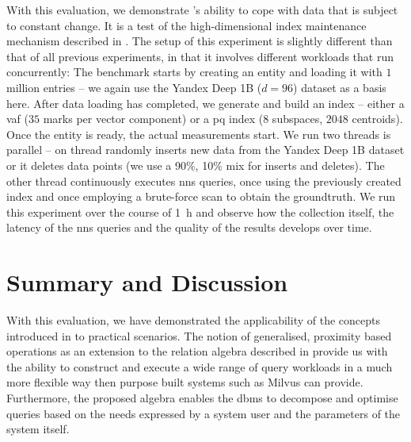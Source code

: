 With this evaluation, we demonstrate \cottontail{}'s ability to cope with data that is subject to constant change. It is a test of the high-dimensional index maintenance mechanism described in . The setup of this experiment is slightly different than that of all previous experiments, in that it involves different workloads that run concurrently: The benchmark starts by creating an entity and loading it with $1$ million entries -- we again use the Yandex Deep 1B ($d = 96$) dataset as a basis here. After data loading has completed, we generate and build an index -- either a \acrshort{vaf} ($35$ marks per vector component) or a \acrshort{pq} index ($8$ subspaces, $2048$ centroids). Once the entity is ready, the actual measurements start. We run two threads is parallel -- on thread randomly inserts new data from the Yandex Deep 1B dataset or it deletes data points (we use a 90\%, 10\% mix for inserts and deletes). The other thread continuously executes \acrshort{nns} queries, once using the previously created index and once employing a brute-force scan to obtain the groundtruth. We run this experiment over the course of \SI{1}{\hour} and observe how the collection itself, the latency of the \acrshort{nns} queries and the quality of the results develops over time.

\section{Summary and Discussion}
\label{section:discussion}

With this evaluation, we have demonstrated the applicability of the concepts introduced in  to practical scenarios. The notion of generalised, proximity based operations as an extension to the relation algebra described in  provide us with the ability to construct and execute a wide range of query workloads in a much more flexible way then purpose built systems such as Milvus \cite{Wang:2021Milvus} can provide. Furthermore, the proposed algebra enables the \acrshort{dbms} to decompose and optimise queries based on the needs expressed by a system user and the parameters of the system itself. 


